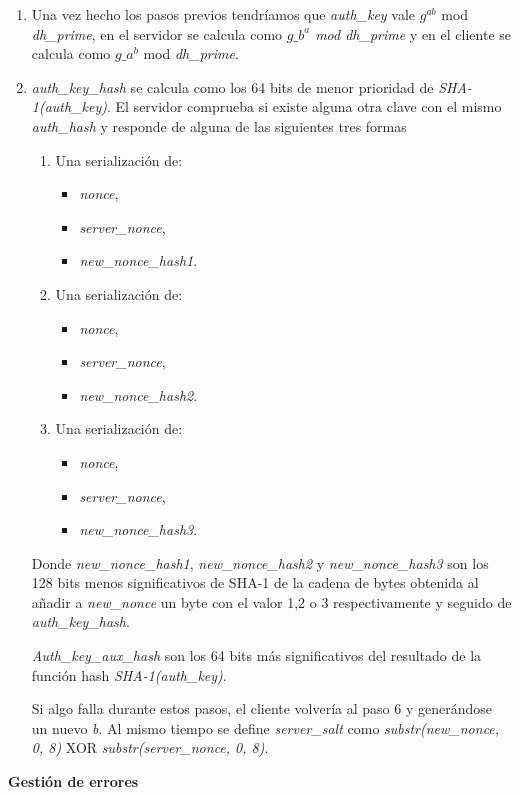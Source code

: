 \begin{enumerate}
\begin{itemize}
\begin{itemize}
				\end{itemize}
		\end{itemize}
	\item Una vez hecho los pasos previos tendríamos que \emph{auth\_key} vale $g^{ab}$ mod \emph{dh\_prime}, en el servidor se calcula como \emph{$g\_b^{a}$ mod \emph{dh\_prime}} y en el cliente se calcula como $g\_a^b$ mod \emph{dh\_prime}.
	\item \emph{auth\_key\_hash} se calcula como los 64 bits de menor prioridad de \emph{SHA-1(auth\_key)}. El servidor comprueba si existe alguna otra clave con el mismo \emph{auth\_hash} y responde de alguna de las siguientes tres formas
	\begin{enumerate}
		\item Una serialización de: 
			\begin{itemize}
				\item \emph{nonce},
				\item \emph{server\_nonce},
				\item \emph{new\_nonce\_hash1}.
			\end{itemize}
		\item Una serialización de:
			\begin{itemize}
				\item \emph{nonce},	
				\item \emph{server\_nonce},
				\item \emph{new\_nonce\_hash2}.
			\end{itemize}
		\item Una serialización de:
			\begin{itemize}
				\item \emph{nonce},	
				\item \emph{server\_nonce},
				\item \emph{new\_nonce\_hash3}.
			\end{itemize}
	\end{enumerate}
	Donde \emph{new\_nonce\_hash1}, \emph{new\_nonce\_hash2} y \emph{new\_nonce\_hash3} son los 128 bits menos significativos de SHA-1 de la cadena de bytes obtenida al añadir a \emph{new\_nonce} un byte con el valor 1,2 o 3 respectivamente y seguido de \emph{auth\_key\_hash}.

	\emph{Auth\_key\_aux\_hash} son los 64 bits más significativos del resultado de la función hash \emph{SHA-1(auth\_key)}.

	Si algo falla durante estos pasos, el cliente volvería al paso 6 y generándose un nuevo \emph{b}. Al mismo tiempo se define \emph{server\_salt} como \emph{substr(new\_nonce, 0, 8)} XOR \emph{substr(server\_nonce, 0, 8)}.
\end{enumerate}
\textbf{Gestión de errores}

